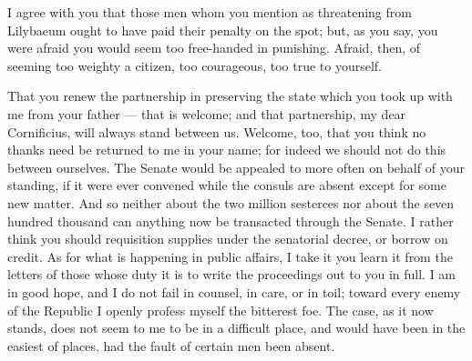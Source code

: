 

 I agree with you that those men whom you mention as threatening from Lilybaeum ought to have paid their penalty on the spot; but, as you say, you were afraid you would seem too free-handed in punishing. Afraid, then, of seeming too weighty a citizen, too courageous, too true to yourself.

 That you renew the partnership in preserving the state which you took up with me from your father --- that is welcome; and that partnership, my dear Cornificius, will always stand between us. Welcome, too, that you think no thanks need be returned to me in your name; for indeed we should not do this between ourselves. The Senate would be appealed to more often on behalf of your standing, if it were ever convened while the consuls are absent except for some new matter. And so neither about the two million sesterces nor about the seven hundred thousand can anything now be transacted through the Senate. I rather think you should requisition supplies under the senatorial decree, or borrow on credit. As for what is happening in public affairs, I take it you learn it from the letters of those whose duty it is to write the proceedings out to you in full. I am in good hope, and I do not fail in counsel, in care, or in toil; toward every enemy of the Republic I openly profess myself the bitterest foe. The case, as it now stands, does not seem to me to be in a difficult place, and would have been in the easiest of places, had the fault of certain men been absent.

